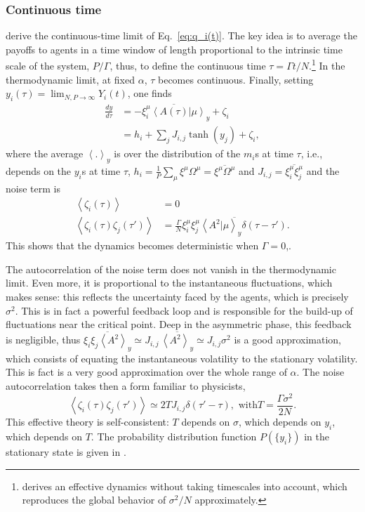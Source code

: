 \documentclass[aps,twocolumn,nofootinbib,sortedaddress,reprint]{revtex4-1}
\begin{document}
\subsubsection{Continuous time}
\label{sec:mg_continuoustime}
\textcite{MC01} derive the continuous-time limit of
Eq.\ \eqref{eq:q_i(t)}. The key idea is to average the payoffs to
agents in a time window of length proportional to the intrinsic time
scale of the system, $P/\Gamma$, thus, to define the continuous time
$\tau=\Gamma t/N$.\footnote{\textcite{Moro1} derives an effective
  dynamics without taking timescales into account, which reproduces the global behavior of $\sigma^2/N$ approximately.} In the
thermodynamic limit, at fixed $\alpha$, $\tau$ becomes
continuous. Finally, setting $y_i(\tau)=\lim_{N,P\to\infty} Y_i(t)$,
one finds
\begin{align}\label{eq:dy}
\frac{dy}{d\tau}&=-\overline{\xi_{i}^\mu\left<A(\tau)|\mu\right>}_y+\zeta_i\\ &=h_i+
\sum_j J_{i,j}\tanh(y_j)+\zeta_i,
\end{align}
where the average $\left<.\right>_y$ is over the distribution of the
$m_i$s at time $\tau$, i.e., depends on the $y_i$s at time $\tau$,
$h_i=\frac{1}{P}\sum_\mu \xi^\mu\Omega^\mu=\overline{\xi^\mu\Omega^\mu}$ and
$J_{i,j}=\overline{\xi_i^\mu\xi_j^\mu}$ and the noise term is
\begin{align}
\left<\zeta_i(\tau)\right>&=0\\ \left<\zeta_i(\tau)\zeta_j(\tau')\right>&=\frac{\Gamma}{N}\overline{\xi_i^\mu\xi_j^\mu\left<A^2|\mu\right>_y\delta(\tau-\tau')}.
\end{align}
This shows that  the dynamics becomes deterministic when $\Gamma=0$,.

The autocorrelation of the noise term does not vanish in the
thermodynamic limit. Even more, it is proportional to the
instantaneous fluctuations, which makes sense: this reflects the
uncertainty faced by the agents, which is precisely $\sigma^2$. This
is in fact a powerful feedback loop and is responsible for the
build-up of fluctuations near the critical point. Deep in the
asymmetric phase, this feedback is negligible, thus
$\overline{\xi_i\xi_j\left<A^2\right>_y}\simeq
J_{i,j}\,\overline{\left<A^2\right>_y}\simeq J_{i,j} \sigma^2$ is a good approximation, which consists of equating the instantaneous volatility to the stationary
volatility. This is fact is a very good approximation over the whole range of $\alpha$.
The noise autocorrelation takes then a form familiar to
physicists,
\begin{equation}
\left<\zeta_i(\tau)\zeta_j(\tau')\right>\simeq
2TJ_{i,j}\delta(\tau'-\tau), \textrm{ with
}T=\frac{\Gamma\sigma^2}{2N}.
\end{equation}
This effective theory is self-consistent: $T$ depends on $\sigma$,
which depends on $y_i$, which depends on $T$. The probability
distribution function $P(\{y_i\})$ in the stationary state is given in
\textcite{MC01}.
\end{document}
